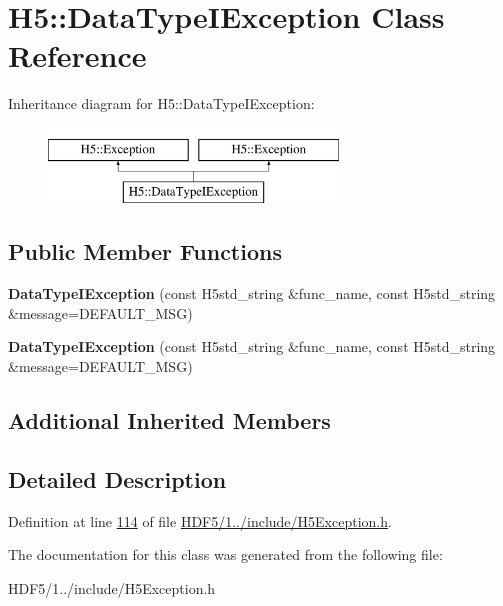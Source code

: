 \hypertarget{class_h5_1_1_data_type_i_exception}{}\section{H5\+:\+:Data\+Type\+I\+Exception Class Reference}
\label{class_h5_1_1_data_type_i_exception}
Inheritance diagram for H5\+:\+:Data\+Type\+I\+Exception\+:\begin{figure}[H]
\begin{center}
\leavevmode
\includegraphics[height=2.000000cm]{class_h5_1_1_data_type_i_exception}
\end{center}
\end{figure}
\subsection*{Public Member Functions}
\begin{DoxyCompactItemize}
\item 
\mbox{\label{class_h5_1_1_data_type_i_exception_a68c85f83a6789ba2adf771a6341bb85b}} 
{\bfseries Data\+Type\+I\+Exception} (const H5std\+\_\+string \&func\+\_\+name, const H5std\+\_\+string \&message=D\+E\+F\+A\+U\+L\+T\+\_\+\+M\+SG)
\item 
\mbox{\label{class_h5_1_1_data_type_i_exception_a68c85f83a6789ba2adf771a6341bb85b}} 
{\bfseries Data\+Type\+I\+Exception} (const H5std\+\_\+string \&func\+\_\+name, const H5std\+\_\+string \&message=D\+E\+F\+A\+U\+L\+T\+\_\+\+M\+SG)
\end{DoxyCompactItemize}
\subsection*{Additional Inherited Members}


\subsection{Detailed Description}


Definition at line \hyperlink{_h_d_f5_21_810_81_2include_2_h5_exception_8h_source_l00114}{114} of file \hyperlink{_h_d_f5_21_810_81_2include_2_h5_exception_8h_source}{H\+D\+F5/1../include/\+H5\+Exception.\+h}.



The documentation for this class was generated from the following file\+:\begin{DoxyCompactItemize}
\item 
H\+D\+F5/1../include/\+H5\+Exception.\+h\end{DoxyCompactItemize}
